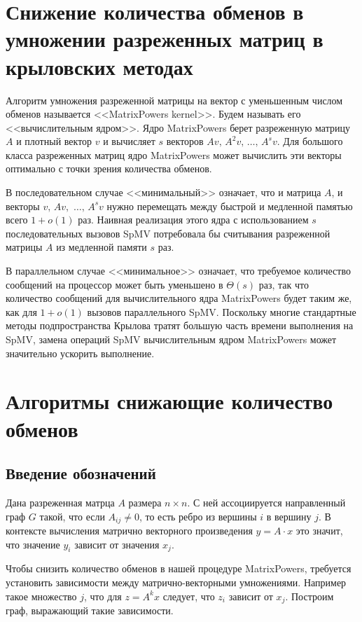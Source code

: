 \documentclass[a4paper,12pt]{report}
\begin{document}
    \chapter{ Снижение количества обменов в умножении разреженных матриц в крыловских методах}
    Алгоритм умножения разреженной матрицы на вектор с уменьшенным числом обменов называется <<MatrixPowers kernel>>. Будем называть его <<вычислительным ядром>>. Ядро MatrixPowers берет разреженную матрицу $A$ и плотный вектор $v$ и вычисляет $s$ векторов $Av,\, A^2v,\, \ldots,\, A^s v$. Для большого класса разреженных матриц ядро MatrixPowers может вычислить эти векторы оптимально с точки зрения количества обменов.
    
    В последовательном случае <<минимальный>> означает, что и матрица $A$, и векторы $v,\, Av,$ $\ldots,\, A^sv$ нужно перемещать между быстрой и медленной памятью всего $1 + o(1)$ раз. Наивная реализация этого ядра с использованием $s$ последовательных вызовов SpMV потребовала бы считывания разреженной матрицы $A$ из медленной памяти $s$ раз. 
    
    В параллельном случае <<минимальное>> означает, что требуемое количество сообщений на процессор может быть уменьшено в $\Theta(s)$ раз, так что количество сообщений для вычислительного ядра MatrixPowers будет таким же, как для $1 + o(1)$ вызовов параллельного SpMV. Поскольку многие стандартные методы подпространства Крылова тратят большую часть времени выполнения на SpMV, замена операций SpMV вычислительным ядром MatrixPowers может значительно ускорить выполнение.

    \chapter{ Алгоритмы снижающие количество обменов }

    \section{ Введение обозначений }

    Дана разреженная матрца $A$ размера $n \times n$. С ней ассоциируется направленный граф $G$ такой, что если $A_{ij} \ne 0$, то есть ребро из вершины $i$ в вершину $j$. В контексте вычисления матрично векторного произведения $y = A \cdot x$ это значит, что значение $y_i$ зависит от значения $x_j$.

    Чтобы снизить количество обменов в нашей процедуре MatrixPowers, требуется установить зависимости между матрично-векторными умножениями. Например такое множество $j$, что для $z = A^k x$ следует, что $z_i$ зависит от $x_j$. Построим граф, выражающий такие зависимости.
\end{document}
